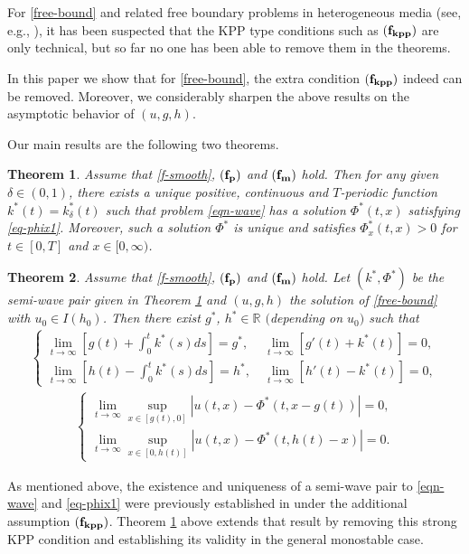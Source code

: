 \documentclass[11pt]{amsart}
\newtheorem{theorem}{Theorem}[section]
\numberwithin{equation}{section}
\begin{document}
For \eqref{free-bound} and related free boundary problems in heterogeneous media (see, e.g., \cite{DGP, DL}), it has been suspected that the KPP type conditions such as ${\bf (f_{kpp})}$ are only technical, but so far no one has been able to remove them in the theorems. 

In this paper we show that for \eqref{free-bound}, the extra condition ${\bf (f_{kpp})}$ indeed can be removed. Moreover, we considerably sharpen the above results on the asymptotic behavior of  $(u, g, h)$.
\smallskip

 Our main results are the following two theorems.

 \begin{theorem}\label{theo-semi-wave} Assume that  \eqref{f-smooth}, ${\bf (f_p)} $  and ${\bf (f_m)}$ hold.  Then for any given $\delta\in(0,1)$, there exists a unique positive, continuous and  $T$-periodic function  $k^*(t)=k_\delta^*(t)$  such that  problem \eqref{eqn-wave} has a  solution  $\Phi^*(t,x)$ satisfying \eqref{eq-phix1}. Moreover, such a solution $\Phi^*$ is unique and satisfies $\Phi_x^*(t,x)>0$ for $t\in[0,T]$ and  $x\in[0,\infty)$.
\end{theorem}

\begin{theorem}\label{thm-exact} Assume that   \eqref{f-smooth}, ${\bf (f_p)} $  and ${\bf (f_m)}$ hold. Let $(k^*,\Phi^*)$ be the semi-wave pair given in Theorem {\rm\ref{theo-semi-wave}} and $(u,g,h)$  the  solution of \eqref{free-bound} with $u_0\in I(h_0) $. Then there exist $g^*$, $h^*\in\mathbb{R}$ $($depending on $u_0)$ such that 
  \begin{eqnarray*}\begin{cases}
    \lim_{t\to\infty}[g(t)+\int_0^tk^*(s)ds]=g^*,~&\lim_{t\to\infty}[g'(t)+k^*(t)]=0,\\
    \lim_{t\to\infty}[h(t)-\int_0^tk^*(s)ds]=h^*,~&\lim_{t\to\infty}[h'(t)-k^*(t)]=0,
    \end{cases}
  \end{eqnarray*}
  \begin{eqnarray*}
    \begin{cases}\lim_{t\to\infty} \sup_{x\in[g(t),0]}|u(t,x)-\Phi^*(t,x-g(t))|=0,\\
    \lim_{t\to\infty} \sup_{x\in[0, h(t)]}|u(t,x)-\Phi^*(t,h(t)-x)|=0.
    \end{cases}
  \end{eqnarray*}
 \end{theorem}
 
 As mentioned above, the existence and uniqueness of a semi-wave pair to \eqref{eqn-wave} and \eqref{eq-phix1} were previously  established in \cite{MDW} under the additional assumption ${\bf (f_{kpp})}$. 
Theorem \ref{theo-semi-wave} above extends that result by removing this strong KPP condition and establishing its validity in the general monostable case.
\end{document}
